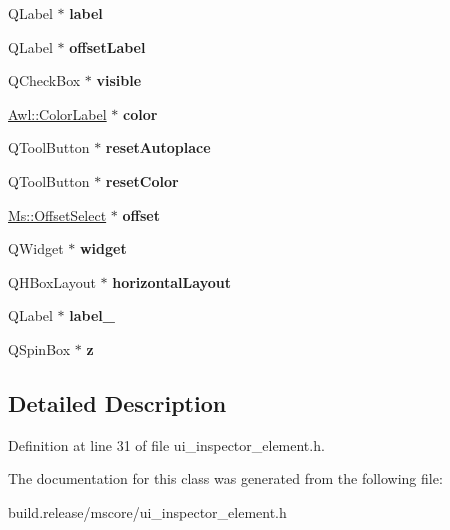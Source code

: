 \begin{DoxyCompactItemize}
Q\+Label $\ast$ {\bfseries label}
\item 
\mbox{\label{class_ui___inspector_element_ad50a5465d42b232c299fd2a24704041a}} 
Q\+Label $\ast$ {\bfseries offset\+Label}
\item 
\mbox{\label{class_ui___inspector_element_aff47693045d375e3b7b1506885942403}} 
Q\+Check\+Box $\ast$ {\bfseries visible}
\item 
\mbox{\label{class_ui___inspector_element_a8fa85cdc7ae5695317ce14cb0f98e2f8}} 
\hyperlink{class_awl_1_1_color_label}{Awl\+::\+Color\+Label} $\ast$ {\bfseries color}
\item 
\mbox{\label{class_ui___inspector_element_a94dc04dd08390a94c3cd2878370c3af3}} 
Q\+Tool\+Button $\ast$ {\bfseries reset\+Autoplace}
\item 
\mbox{\label{class_ui___inspector_element_af48e7b8cec08971558bb18beb08ca9f6}} 
Q\+Tool\+Button $\ast$ {\bfseries reset\+Color}
\item 
\mbox{\label{class_ui___inspector_element_a762ded41cd2fe867b6afb9248b0f6317}} 
\hyperlink{class_ms_1_1_offset_select}{Ms\+::\+Offset\+Select} $\ast$ {\bfseries offset}
\item 
\mbox{\label{class_ui___inspector_element_a31dd2d3224f226dc0bd85e8959515a43}} 
Q\+Widget $\ast$ {\bfseries widget}
\item 
\mbox{\label{class_ui___inspector_element_abf278c41aff60e45d6b65a3ec16adb46}} 
Q\+H\+Box\+Layout $\ast$ {\bfseries horizontal\+Layout}
\item 
\mbox{\label{class_ui___inspector_element_a3f8834668fe46241d9b19aaa1966923c}} 
Q\+Label $\ast$ {\bfseries label\+\_}
\item 
\mbox{\label{class_ui___inspector_element_a094b24be2109a402edfa4a716d963b03}} 
Q\+Spin\+Box $\ast$ {\bfseries z}
\end{DoxyCompactItemize}


\subsection{Detailed Description}


Definition at line 31 of file ui\+\_\+inspector\+\_\+element.\+h.



The documentation for this class was generated from the following file\+:\begin{DoxyCompactItemize}
\item 
build.\+release/mscore/ui\+\_\+inspector\+\_\+element.\+h\end{DoxyCompactItemize}
